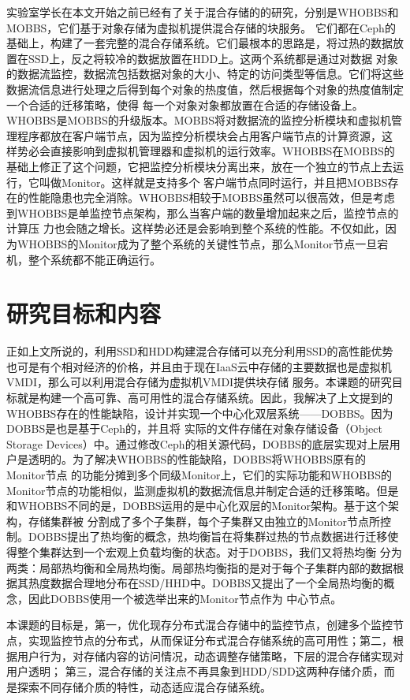 实验室学长在本文开始之前已经有了关于混合存储的的研究，分别是WHOBBS\cite{lingxuan2015whobbs}和MOBBS\cite{ma2014mobbs}，它们基于对象存储为虚拟机提供混合存储的块服务。
它们都在Ceph\cite{weil2006ceph}的基础上，构建了一套完整的混合存储系统。它们最根本的思路是，将过热的数据放置在SSD上，反之将较冷的数据放置在HDD上。这两个系统都是通过对数据
对象的数据流监控，数据流包括数据对象的大小、特定的访问类型等信息。它们将这些数据流信息进行处理之后得到每个对象的热度值，然后根据每个对象的热度值制定一个合适的迁移策略，使得
每一个对象对象都放置在合适的存储设备上。WHOBBS是MOBBS的升级版本。MOBBS将对数据流的监控分析模块和虚拟机管理程序都放在客户端节点，因为监控分析模块会占用客户端节点的计算资源，这
样势必会直接影响到虚拟机管理器和虚拟机的运行效率。WHOBBS在MOBBS的基础上修正了这个问题，它把监控分析模块分离出来，放在一个独立的节点上去运行，它叫做Monitor。这样就是支持多个
客户端节点同时运行，并且把MOBBS存在的性能隐患也完全消除。WHOBBS相较于MOBBS虽然可以很高效，但是考虑到WHOBBS是单监控节点架构，那么当客户端的数量增加起来之后，监控节点的计算压
力也会随之增长。这样势必还是会影响到整个系统的性能。不仅如此，因为WHOBBS的Monitor成为了整个系统的关键性节点，那么Monitor节点一旦宕机，整个系统都不能正确运行。

\section{研究目标和内容}
正如上文所说的，利用SSD和HDD构建混合存储可以充分利用SSD的高性能优势也可是有个相对经济的价格，并且由于现在IaaS云中存储的主要数据也是虚拟机VMDI，那么可以利用混合存储为虚拟机VMDI提供块存储
服务。本课题的研究目标就是构建一个高可靠、高可用性的混合存储系统。因此，我解决了上文提到的WHOBBS存在的性能缺陷，设计并实现一个中心化双层系统——DOBBS。因为DOBBS是也是基于Ceph的，并且将
实际的文件存储在对象存储设备（Object Storage Devices）中。通过修改Ceph的相关源代码，DOBBS的底层实现对上层用户是透明的。为了解决WHOBBS的性能缺陷，DOBBS将WHOBBS原有的Monitor节点
的功能分摊到多个同级Monitor上，它们的实际功能和WHOBBS的Monitor节点的功能相似，监测虚拟机的数据流信息并制定合适的迁移策略。但是和WHOBBS不同的是，DOBBS运用的是中心化双层的Monitor架构。基于这个架构，存储集群被
分割成了多个子集群，每个子集群又由独立的Monitor节点所控制。DOBBS提出了热均衡的概念，热均衡旨在将集群过热的节点数据进行迁移使得整个集群达到一个宏观上负载均衡的状态。对于DOBBS，我们又将热均衡
分为两类：局部热均衡和全局热均衡。局部热均衡指的是对于每个子集群内部的数据根据其热度数据合理地分布在SSD/HHD中。DOBBS又提出了一个全局热均衡的概念，因此DOBBS使用一个被选举出来的Monitor节点作为
中心节点。

本课题的目标是，第一，优化现存分布式混合存储中的监控节点，创建多个监控节点，实现监控节点的分布式，从而保证分布式混合存储系统的高可用性；第二，根据用户行为，对存储内容的访问情况，动态调整存储策略，下层的混合存储实现对用户透明；
第三，混合存储的关注点不再具象到HDD/SDD这两种存储介质，而是探索不同存储介质的特性，动态适应混合存储系统。

